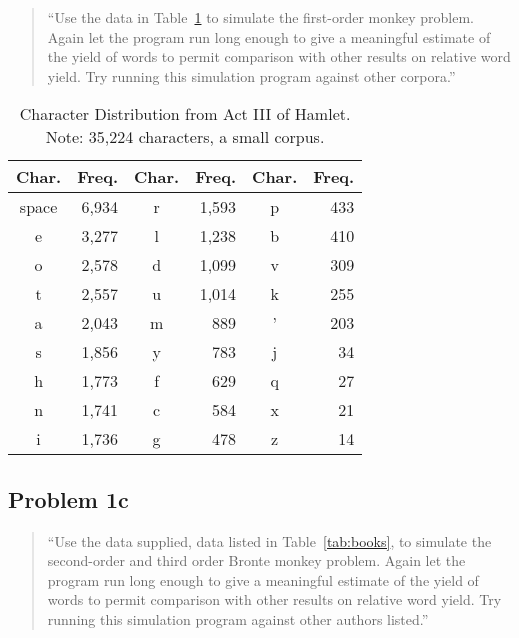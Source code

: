 \documentclass[conference]{IEEEtran}
\begin{document}
\begin{quote}
``Use the data in Table~\ref{tab:hamlet} to simulate the first-order monkey problem. 
Again let the program run long enough to give a meaningful estimate of the yield 
of words to permit comparison with other results on relative word yield. Try running
this simulation program against other corpora.''
\end{quote}

\begin{table}
\caption{\hspace{2em}Character Distribution from Act III of Hamlet. \newline
Note: 35,224 characters, a small corpus.\label{tab:hamlet}}
\vspace{-10pt}
\begin{center}
\begin{tabular}{crcrcr}
\hline
Char. & Freq. & Char. & Freq. & Char. & Freq. \\
\hline
space & 6,934  & r     & 1,593  & p     & 433   \\
e     & 3,277  & l     & 1,238  & b     & 410   \\
o     & 2,578  & d     & 1,099  & v     & 309   \\
t     & 2,557  & u     & 1,014  & k     & 255   \\
a     & 2,043  & m     & 889   & '     & 203   \\
s     & 1,856  & y     & 783   & j     & 34    \\
h     & 1,773  & f     & 629   & q     & 27    \\
n     & 1,741  & c     & 584   & x     & 21    \\
i     & 1,736  & g     & 478   & z     & 14    \\
\hline
\end{tabular}
\end{center}
\end{table}

\begin{framed}
\fontsize{5.65}{6.78}\selectfont

\end{framed}


\subsection{Problem 1c}

\begin{quote}
``Use the data supplied, data listed in Table~\ref{tab:books}, to simulate the 
second-order and third order Bronte monkey problem. Again let the program run 
long enough to give a meaningful estimate of the yield of words to permit 
comparison with other results on relative word yield. Try running this 
simulation program against other authors listed.''
\end{quote}
\end{document}
